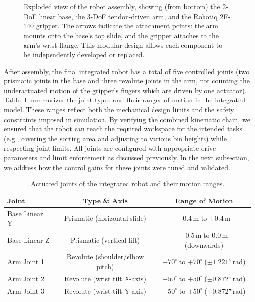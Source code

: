 \begin{figure}[htb]
\centering
{}
\caption[Exploded view of robot assembly]{Exploded view of the robot assembly, showing (from bottom) the 2-\acs{DoF} linear base, the 3-\acs{DoF} tendon-driven arm, and the Robotiq 2F-140 gripper. The arrows indicate the attachment points: the arm mounts onto the base's top slide, and the gripper attaches to the arm's wrist flange. This modular design allows each component to be independently developed or replaced.}\label{fig:robot-exploded}
\end{figure}

After assembly, the final integrated robot has a total of five controlled joints (two prismatic joints in the base and three revolute joints in the arm, not counting the underactuated motion of the gripper's fingers which are driven by one actuator). Table~\ref{tab:joint-limits} summarizes the joint types and their ranges of motion in the integrated model. These ranges reflect both the mechanical design limits and the safety constraints imposed in simulation. By verifying the combined kinematic chain, we ensured that the robot can reach the required workspace for the intended tasks (e.g., covering the sorting area and adjusting to various bin heights) while respecting joint limits. All joints are configured with appropriate drive parameters and limit enforcement as discussed previously. In the next subsection, we address how the control gains for these joints were tuned and validated.

\begin{table}[htb]
    \centering
    \caption{Actuated joints of the integrated robot and their motion ranges.}\label{tab:joint-limits}
    \begin{tabular}{l c c}
    \hline
    \textbf{Joint} & \textbf{Type \& Axis} & \textbf{Range of Motion} \\
    \hline
    Base Linear Y & Prismatic (horizontal slide)    & $-0.4\,\mathrm{m}$ to $+0.4\,\mathrm{m}$ \\
    Base Linear Z & Prismatic (vertical lift)       & $-0.5\,\mathrm{m}$ to $0.0\,\mathrm{m}$ (downwards) \\
    Arm Joint 1   & Revolute (shoulder/elbow pitch) & $-70^\circ$ to $+70^\circ$ ($\pm 1.2217\,\mathrm{rad}$) \\
    Arm Joint 2   & Revolute (wrist tilt X-axis)    & $-50^\circ$ to $+50^\circ$ ($\pm 0.8727\,\mathrm{rad}$) \\
    Arm Joint 3   & Revolute (wrist tilt Y-axis)    & $-50^\circ$ to $+50^\circ$ ($\pm 0.8727\,\mathrm{rad}$) \\
    \hline
    \end{tabular}
\end{table}

